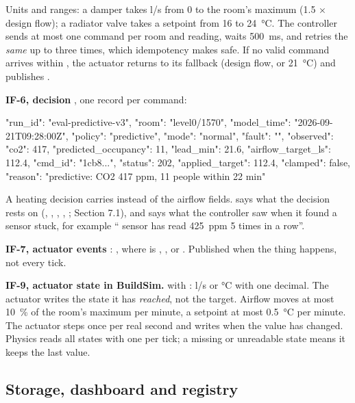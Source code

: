 Units and ranges: a damper takes l/s from 0 to the room's maximum
(1.5 × design flow); a radiator valve takes a setpoint from 16 to 24~°C. The
controller sends at most one command per room and reading, waits 500~ms, and
retries the \emph{same}  up to three times, which idempotency
makes safe. If no valid command arrives within , the actuator
returns to its fallback (design flow, or 21~°C) and publishes
.

\textbf{IF-6, decision} , one record per command:

\begin{json}
{"run_id": "eval-predictive-v3", "room": "level0/1570",
 "model_time": "2026-09-21T09:28:00Z", "policy": "predictive",
 "mode": "normal", "fault": "", "observed": {"co2": 417},
 "predicted_occupancy": 11, "lead_min": 21.6, "airflow_target_ls": 112.4,
 "cmd_id": "1cb8...", "status": 202, "applied_target": 112.4, "clamped": false,
 "reason": "predictive: CO2 417 ppm, 11 people within 22 min"}
\end{json}

A heating decision carries  instead of the airflow
fields.  says what the decision rests on (,
, , ,
; Section 7.1), and  says what the controller
saw when it found a sensor stuck, for example ``\COtwo{} sensor has read
425~ppm 5 times in a row''.

\textbf{IF-7, actuator events} :
, where  is ,
,  or . Published
when the thing happens, not every tick.

\textbf{IF-9, actuator state in BuildSim.}
 with
: l/s or °C with one decimal. The actuator writes
the state it has \emph{reached}, not the target. Airflow moves at most 10~\% of
the room's maximum per minute, a setpoint at most 0.5~°C per minute. The
actuator steps once per real second and writes when the value has changed.
Physics reads all states with one  per
tick; a missing or unreadable state means it keeps the last value.

\subsection{Storage, dashboard and registry}

